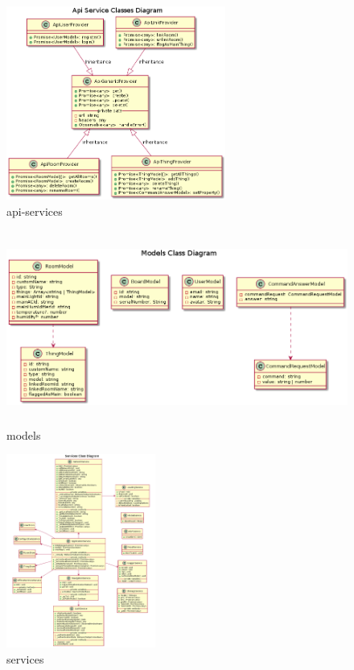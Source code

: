 \begin{figure}[hbt!]
\centering
\includegraphics[height=2.5in]{figures/diagrams/front/architecture/api-services.png}
\caption[api-services]{api-services\footnotemark}
\end{figure}

\begin{figure}[hbt!]
\centering
\includegraphics[height=2.5in]{figures/diagrams/front/architecture/models.png}
\caption[models]{models\footnotemark}
\end{figure}

\begin{figure}[hbt!]
\centering
\includegraphics[height=2.5in]{figures/diagrams/front/architecture/services.png}
\caption[services]{services\footnotemark}
\end{figure}

